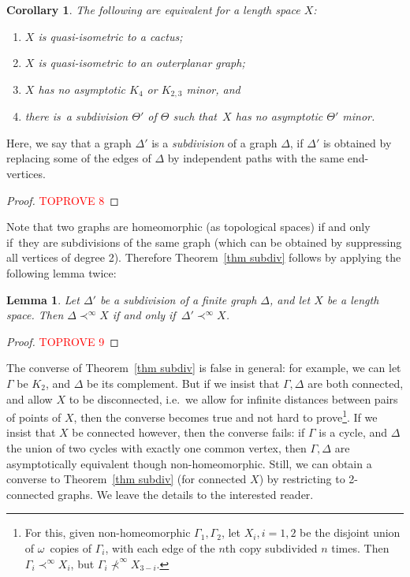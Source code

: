 \documentclass[a4paper]{article}
\newcommand{\defi}[1]{{\color{darkgray}\emph{#1}}}
\newtheorem{corollary}[proposition]{Corollary}
\newtheorem{lemma}[proposition]{Lemma}
\newcommand{\oo}{\ensuremath{\omega}}
\newcommand{\Tr}[1]{Theorem~\ref{#1}}
\renewcommand{\iff}{if and only if}
\newcommand{\st}{such that}
\newcommand{\ti}{there is}
\newcommand{\asm}[2]{\ensuremath{#1 \prec^\infty #2}}
\newcommand{\nasm}[2]{\ensuremath{#1 \not \prec^\infty #2}}
\begin{document}
\begin{corollary} \label{cor OP}
The following are equivalent for a length space $X$:
\begin{enumerate}
         \item \label{OP ii} $X$ is quasi-isometric to a cactus; 
         \item \label{OP i} $X$ is quasi-isometric to an outerplanar graph;
      \item \label{OP iii} $X$ has no asymptotic $K_4$ or  $K_{2,3}$ minor, and
      \item \label{OP iv} \ti\ a subdivision $\Theta'$ of $\Theta$ \st\ $X$ has no asymptotic $\Theta'$ minor.
\end{enumerate}
\end{corollary}
Here, we say that a graph $\Delta'$ is a \defi{subdivision} of a graph $\Delta$, if $\Delta'$ is obtained by replacing some of the edges of $\Delta$ by independent paths with the same end-vertices.

\begin{proof}\textcolor{red}{TOPROVE 8}\end{proof}



Note that two graphs are homeomorphic (as topological spaces) \iff\ they are subdivisions of the same graph (which can be obtained by suppressing all vertices of degree 2). Therefore \Tr{thm subdiv} follows by applying the following lemma twice:

\begin{lemma} \label{lem subdiv}
Let $\Delta'$ be a subdivision of a finite graph $\Delta$, and let $X$ be a length space. Then \asm{\Delta}{X} \iff\ \asm{\Delta'}{X}.
\end{lemma}
\begin{proof}\textcolor{red}{TOPROVE 9}\end{proof}

The converse of \Tr{thm subdiv} is false in general: for example, we can let $\Gamma$ be $K_2$, and $\Delta$ be its complement. But if we insist that $\Gamma,\Delta$ are both connected, and allow $X$ to be disconnected, i.e.\ we allow for infinite distances between pairs of points of $X$, then the converse becomes true and not hard to prove\footnote{For this, given non-homeomorphic $\Gamma_1,\Gamma_2$, let $X_i, i=1,2$ be the disjoint union of \oo\ copies of $\Gamma_i$, with each edge of the $n$th copy subdivided $n$ times. Then  $\asm{\Gamma_i}{X_i}$, but $\nasm{\Gamma_i}{X_{3-i}}$.}. If we insist that $X$ be connected however, then the converse fails: if $\Gamma$ is a cycle, and $\Delta$ the union of two cycles with exactly one common vertex, then $\Gamma,\Delta$ are asymptotically equivalent though non-homeomorphic. 
Still, we can obtain a converse to \Tr{thm subdiv} (for connected $X$) by restricting to 2-connected graphs. We leave the details to the interested reader.
\end{document}
